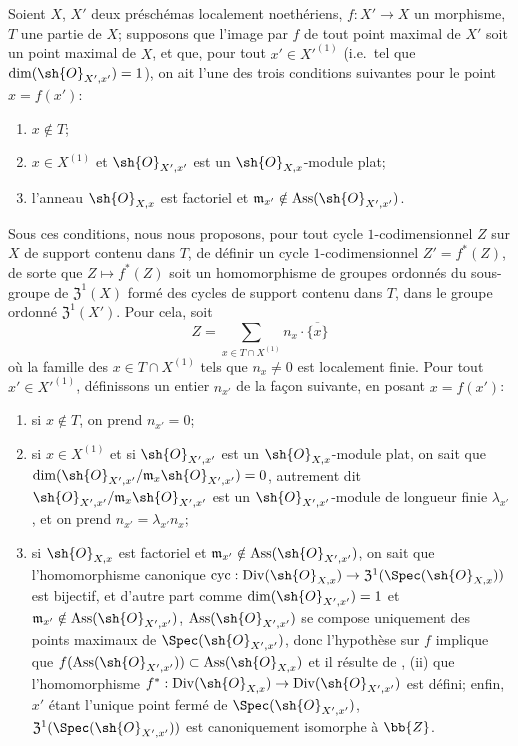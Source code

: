 Soient $X$, $X'$ deux préschémas localement noethériens, $f:X'\to X$ un morphisme, $T$ une partie de $X$;
supposons que l'image par $f$ de tout point maximal de $X'$ soit un point maximal de $X$, et que, pour tout $x'\in X'^{(1)}$ (i.e.\ tel que $\dim(\sh{O}_{X',x'})=1$), on ait l'une des trois conditions suivantes pour le point $x=f(x')$:
\begin{enumerate}[label=(\roman*)]
  \item $x\notin T$;
  \item $x\in X^{(1)}$ et $\sh{O}_{X',x'}$ est un $\sh{O}_{X,x}$-module plat;
  \item l'anneau $\sh{O}_{X,x}$ est factoriel et $\mathfrak{m}_{x'}\notin\operatorname{Ass}(\sh{O}_{X',x'})$.
\end{enumerate}
Sous ces conditions, nous nous proposons, pour tout cycle $1$-codimensionnel $Z$ sur $X$ de support contenu dans $T$, de définir un cycle $1$-codimensionnel $Z'=f^*(Z)$, de sorte que $Z\mapsto f^*(Z)$ soit un homomorphisme de groupes ordonnés du sous-groupe de $\mathfrak{Z}^1(X)$ formé des cycles de support contenu dans $T$, dans le groupe ordonné $\mathfrak{Z}^1(X')$.
Pour cela, soit
\[
\label{IV.21.10.1.1}
  Z=\sum_{x\in T\cap X^{(1)}}n_x\cdot\overline{\{x\}}
  \tag{21.10.1.1}
\]
où la famille des $x\in T\cap X^{(1)}$ tels que $n_x\neq0$ est localement finie.
Pour tout $x'\in X'^{(1)}$, définissons un entier $n_{x'}$ de la façon suivante, en posant $x=f(x')$:
\begin{enumerate}[label=\arabic*\textsuperscript{o}]
  \item si $x\notin T$, on prend $n_{x'}=0$;
  \item si $x\in X^{(1)}$ et si $\sh{O}_{X',x'}$ est un $\sh{O}_{X,x}$-module plat, on sait  que $\dim(\sh{O}_{X',x'}/\mathfrak{m}_x\sh{O}_{X',x'})=0$, autrement dit $\sh{O}_{X',x'}/\mathfrak{m}_x\sh{O}_{X',x'}$ est un $\sh{O}_{X',x'}$-module de longueur finie $\lambda_{x'}$, et on prend $n_{x'}=\lambda_{x'}n_x$;
  \item si $\sh{O}_{X,x}$ est factoriel et $\mathfrak{m}_{x'}\notin\operatorname{Ass}(\sh{O}_{X',x'})$, on sait  que l'homomorphisme canonique $\operatorname{cyc}:\operatorname{Div}(\sh{O}_{X,x})\to\mathfrak{Z}^1(\Spec(\sh{O}_{X,x}))$ est bijectif, et d'autre part comme $\dim(\sh{O}_{X',x'})=1$ et $\mathfrak{m}_{x'}\notin\operatorname{Ass}(\sh{O}_{X',x'})$, $\operatorname{Ass}(\sh{O}_{X',x'})$ se compose uniquement des points maximaux de $\Spec(\sh{O}_{X',x'})$, donc l'hypothèse sur $f$ implique que $f(\operatorname{Ass}(\sh{O}_{X',x'}))\subset\operatorname{Ass}(\sh{O}_{X,x})$ et il résulte de , (ii) que l'homomorphisme $f^*:\operatorname{Div}(\sh{O}_{X,x})\to\operatorname{Div}(\sh{O}_{X',x'})$ est défini;
enfin, $x'$ étant l'unique point fermé de $\Spec(\sh{O}_{X',x'})$, $\mathfrak{Z}^1(\Spec(\sh{O}_{X',x'}))$ est canoniquement isomorphe à $\bb{Z}$.
\end{enumerate}
